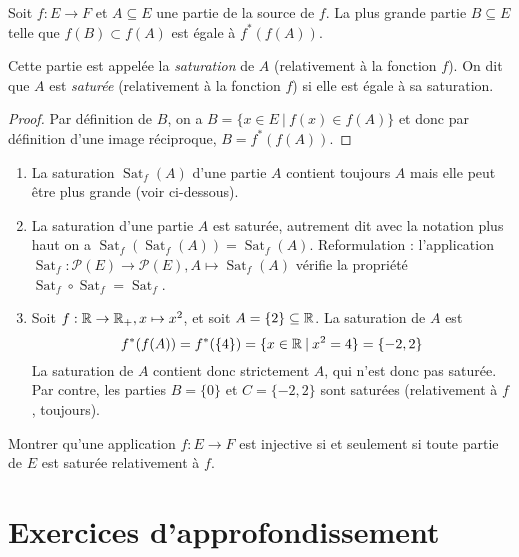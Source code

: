 \begin{propdef}
Soit $f : E\to F$ et $A \subseteq E$ une partie de la source de $f$. La plus grande partie $B\subseteq E$ telle que $f(B) \subset f(A)$ est égale à $f^*(f(A))$.

Cette partie est appelée la \emph{saturation} de $A$ (relativement à la fonction $f$). On dit que $A$ est \emph{saturée} (relativement à la fonction $f$) si elle est égale à sa saturation.
\end{propdef}
\begin{proof}
Par définition de $B$, on a $B = \{x\in E\:|\: f(x)\in f(A) \}$ et donc par définition d'une image réciproque, $B = f^*(f(A))$.
\end{proof}

\begin{exemple}
\begin{enumerate}
\item La saturation $\operatorname{Sat}_f(A)$ d'une partie $A$ contient toujours $A$ mais elle peut être plus grande (voir ci-dessous).
\item La saturation d'une partie $A$ est saturée, autrement dit avec la notation plus haut  on a  $\operatorname{Sat}_f(\operatorname{Sat}_f(A)) = \operatorname{Sat}_f(A)$. Reformulation : l'application $\operatorname{Sat}_f : \mathcal P(E) \to \mathcal P(E), A\mapsto \operatorname{Sat}_f(A)$ vérifie la propriété $\operatorname{Sat}_f \circ \operatorname{Sat}_f = \operatorname{Sat}_f$.
\item Soit $f : \mathbb{R}\to \mathbb{R}_+, x\mapsto x^2$, et soit $A=\{2\} \subseteq \mathbb{R}$. La saturation de $A$ est 
\[f^*(f(A)) = f^*(\{4\}) = \{x\in \mathbb{R}\:|\: x^2=4\} = \{-2,2\}
\]
La saturation de $A$ contient donc strictement $A$, qui n'est donc pas saturée. Par contre, les parties $B = \{0\}$ et $C=\{-2,2\}$ sont saturées (relativement à $f$, toujours).
\end{enumerate}
\end{exemple}

\begin{exercice}
Montrer qu'une application $f:E\to F$ est injective si et seulement si toute partie de $E$ est saturée relativement à $f$.
\end{exercice}







\section{Exercices d'approfondissement}

